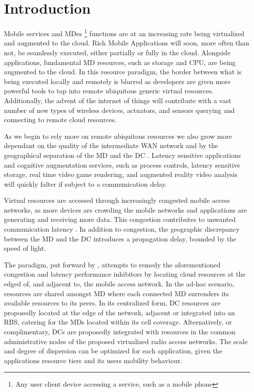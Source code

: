 \section{Introduction}

Mobile services and \ac{MD}es \footnote{Any user client device accessing a service, such as a mobile phone} functions are at an increasing rate being virtualized and augmented to the cloud. Rich Mobile Applications \cite{March2011618} will soon, more often than not, be seamlessly executed, either partially or fully in the cloud. Alongside applications, fundamental \ac{MD} resources, such as storage and CPU, are being augmented to the cloud. In this resource paradigm, the border between what is being executed locally and remotely is blurred as developers are given more powerful tools to tap into remote ubiquitous generic virtual resources. Additionally, the advent of the internet of things will contribute with a vast number of new types of wireless devices, actuators, and sensors querying and connecting to remote cloud resources. 

As we begin to rely more on remote ubiquitous resources we also grow more dependant on the quality of the intermediate WAN network and by the geographical separation of the \ac{MD} and the \ac{DC} \cite{choi2007analysis}. Latency sensitive applications and cognitive augmentation services, such as process controls, latency sensitive storage, real time video game rendering, and augmented reality video analysis will quickly falter if subject to a  communication delay.

Virtual resources are accessed through increasingly congested mobile access networks, as more devices are crowding the mobile networks and applications are generating and receiving more data. This congestion contributes to unwanted communication latency \cite{hu2005measurement}. In addition to congestion, the geographic discrepancy between the \ac{MD} and the \ac{DC} introduces a propagation delay, bounded by the speed of light.

The \xcloud{} paradigm, put forward by \cite{chandra2013decentralized,ericsson_akami,satyanarayanan2009case,kiukkonen2010towards,March2011618}, attempts to remedy the aforementioned congestion and latency performance inhibitors by locating cloud resources at the edged of, and adjacent to, the mobile access network. In the ad-hoc scenario, resources are shared amongst \ac{MD} where each connected \ac{MD} surrenders its available resources to its peers. In its centralized form, \ac{DC} resources are proposedly located at the edge of the network, adjacent or integrated into an \ac{RBS}, catering for the \ac{MD}s located within its cell coverage. Alternatively, or complimentary, \ac{DC}s are proposedly integrated with resources in the common administrative nodes of the proposed virtualized radio access networks. The scale and degree of dispersion can be optimized for each application, given the applications resource tiers and its users mobility behaviour.

